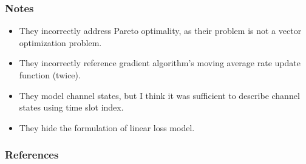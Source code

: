 \documentclass{beamer}
\begin{document}
\begin{frame}
  \frametitle{Notes}
  \begin{itemize}
    \item They incorrectly address Pareto optimality, as their problem is not a vector optimization problem.
    \item They incorrectly reference gradient algorithm's moving average rate update function (twice).
    \item They model channel states, but I think it was sufficient to describe channel states using time slot index.
    \item They hide the formulation of linear loss model.
  \end{itemize}
\end{frame}

\begin{frame}
  \frametitle{References}
  \printbibliography[heading=none]
\end{frame}
\end{document}
